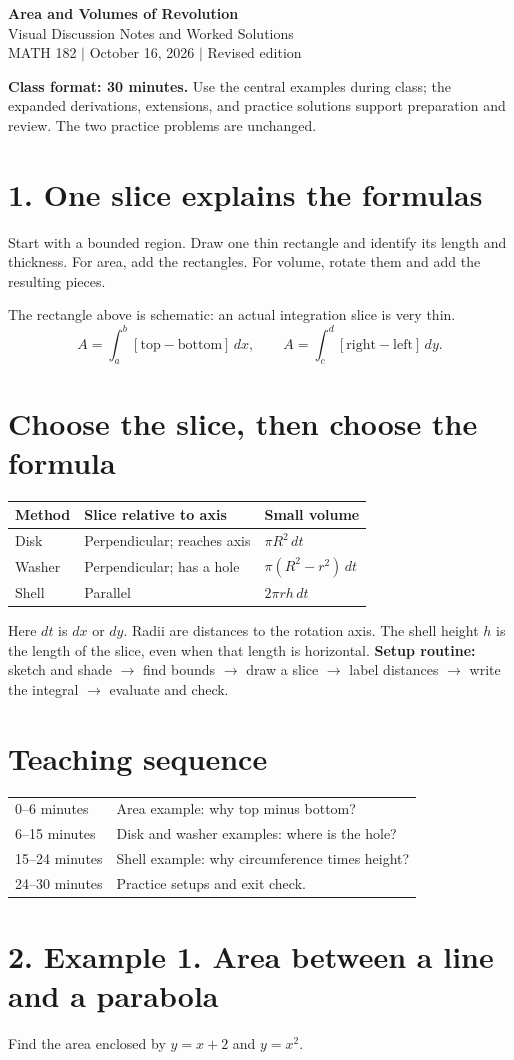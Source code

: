 \documentclass[11pt,letterpaper]{article}
\newcommand{\topic}[1]{\section*{#1}}
\begin{document}
\begin{center}{\LARGE\bfseries Area and Volumes of Revolution}\\[6pt]{\large Visual Discussion Notes and Worked Solutions}\\[4pt]MATH 182 $\vert$ October 16, 2026 $\vert$ Revised edition\end{center}
\textbf{Class format: 30 minutes.} Use the central examples during class; the expanded derivations, extensions, and practice solutions support preparation and review. The two practice problems are unchanged.
\topic{1. One slice explains the formulas}
Start with a bounded region. Draw one thin rectangle and identify its length and thickness. For area, add the rectangles. For volume, rotate them and add the resulting pieces.
\begin{center}
\end{center}
The rectangle above is schematic: an actual integration slice is very thin.
\[
A=\int_a^b[\text{top}-\text{bottom}]\,dx,
\qquad
A=\int_c^d[\text{right}-\text{left}]\,dy.
\]
\topic{Choose the slice, then choose the formula}
\begin{center}\begin{tabular}{p{1.2in}p{2.0in}p{2.8in}}\toprule
Method & Slice relative to axis & Small volume\\\midrule
Disk & Perpendicular; reaches axis & $\pi R^2\,dt$\\[5pt]
Washer & Perpendicular; has a hole & $\pi(R^2-r^2)\,dt$\\[5pt]
Shell & Parallel & $2\pi rh\,dt$\\\bottomrule
\end{tabular}\end{center}
Here $dt$ is $dx$ or $dy$. Radii are distances to the rotation axis. The shell height $h$ is the length of the slice, even when that length is horizontal.
\textbf{Setup routine:} sketch and shade $\to$ find bounds $\to$ draw a slice $\to$ label distances $\to$ write the integral $\to$ evaluate and check.
\topic{Teaching sequence}
\begin{tabular}{ll}
0--6 minutes & Area example: why top minus bottom?\\
6--15 minutes & Disk and washer examples: where is the hole?\\
15--24 minutes & Shell example: why circumference times height?\\
24--30 minutes & Practice setups and exit check.
\end{tabular}
\newpage
\topic{2. Example 1. Area between a line and a parabola}
Find the area enclosed by $y=x+2$ and $y=x^2$.
\end{document}
